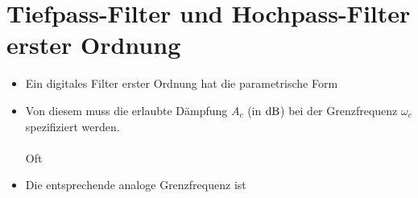 \section{Tiefpass-Filter und Hochpass-Filter erster Ordnung}
	\begin{itemize}
		\item Ein digitales Filter erster Ordnung hat die parametrische Form$\qquad$\\[-0.15cm]
		\item Von diesem muss die erlaubte Dämpfung $A_c$ (in $\text{dB}$) bei der Grenzfrequenz $\omega_c$ spezifiziert werden.\\[0.1cm]
		$\qquad$$\qquad$\\[0.15cm]
		Oft$\quad$ \\[-0.5cm]
		\item Die entsprechende analoge Grenzfrequenz ist$\qquad$\\[0.2cm]
	\end{itemize}
